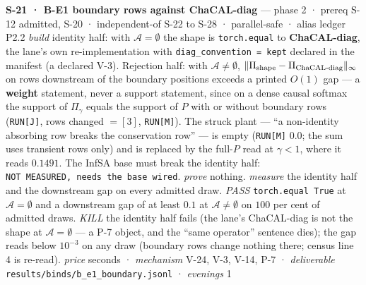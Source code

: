 \documentclass[11pt,a4paper]{article}
\theoremstyle{plain}
\theoremstyle{definition}
\theoremstyle{remark}
\begin{document}
\textbf{S-21 · B-E1 boundary rows against ChaCAL-diag} --- phase 2 ·
prereq S-12 admitted, S-20 · independent-of S-22 to S-28 · parallel-safe
· alias ledger P2.2 \emph{build} identity half: with
\(\mathcal{A}=\emptyset\) the shape is \texttt{torch.equal} to
\textbf{ChaCAL-diag}, the lane's own re-implementation with
\texttt{diag\_convention\ =\ kept} declared in the manifest (a declared
V-3). Rejection half: with \(\mathcal{A}\ne\emptyset\),
\(\|\Pi_{\rm shape}-\Pi_{\rm ChaCAL\text{-}diag}\|_\infty\) on rows
downstream of the boundary positions exceeds a printed \(O(1)\) gap ---
a \textbf{weight} statement, never a support statement, since on a dense
causal softmax the support of \(\Pi_\gamma\) equals the support of \(P\)
with or without boundary rows (\texttt{RUN{[}J{]}}, rows changed
\(=[3]\), \texttt{RUN{[}M{]}}). The struck plant --- ``a non-identity
absorbing row breaks the conservation row'' --- is empty
(\texttt{RUN{[}M{]}} \(0.0\); the sum uses transient rows only) and is
replaced by the full-\(P\) read at \(\gamma<1\), where it reads
\(0.1491\). The InfSA base must break the identity half:
\texttt{NOT\ MEASURED,\ needs\ the\ base\ wired}. \emph{prove} nothing.
\emph{measure} the identity half and the downstream gap on every
admitted draw. \emph{PASS} \texttt{torch.equal\ True} at
\(\mathcal{A}=\emptyset\) and a downstream gap of at least \(0.1\) at
\(\mathcal{A}\ne\emptyset\) on \(100\) per cent of admitted draws.
\emph{KILL} the identity half fails (the lane's ChaCAL-diag is not the
shape at \(\mathcal{A}=\emptyset\) --- a P-7 object, and the ``same
operator'' sentence dies); the gap reads below \(10^{-3}\) on any draw
(boundary rows change nothing there; census line 4 is re-read).
\emph{price} seconds · \emph{mechanism} V-24, V-3, V-14, P-7 ·
\emph{deliverable} \texttt{results/binds/b\_e1\_boundary.jsonl} ·
\emph{evenings} 1
\end{document}
